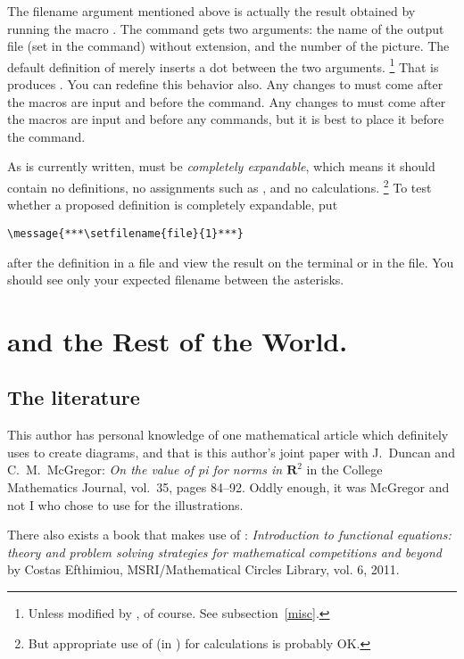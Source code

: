 \documentclass[letterpaper]{article}
\begin{document}
The filename argument mentioned above is actually the result obtained by
running the macro .
The command  gets two arguments: the name of the \MP{}
output file (set in the  command) without extension,
and the number of the picture. The default definition of
 merely inserts a dot between the two arguments.%
    \footnote{Unless modified by , of course.
    See subsection~\ref{misc}.}
That is  produces . You
can redefine this behavior also. Any changes to  must
come after the \mfp{} macros are input and before the
 command. Any changes to  must
come after the \mfp{} macros are input and before any 
commands, but it is best to place it before the 
command.

As \mfp{} is currently written,  must be
\emph{completely expandable}, which means it should contain no
definitions, no assignments such as , and no
calculations.%
    \footnote{But appropriate use of  (in \eTeX) for
    calculations is probably OK.}
To test whether a proposed definition is completely
expandable, put
\begin{verbatim}
\message{***\setfilename{file}{1}***}
\end{verbatim}
after the definition in a  file and view the result on the
terminal or in the  file. You should see only your expected
filename between the asterisks.


\section{ and the Rest of the World.}

\subsection{The literature}

This author has personal knowledge of one mathematical article
which definitely uses \mfp{} to create diagrams, and that is this
author's joint paper with J.~Duncan and C.~M.~McGregor: \textit{On the
value of pi for norms in $\mathbf{R}^2$} in the College Mathematics
Journal, vol.~35, pages 84--92. Oddly enough, it was McGregor and not I
who chose to use \mfp{} for the illustrations.

There also exists a book that makes use of \mfp{}: \textit{Introduction
to functional equations: theory and problem solving strategies for
mathematical competitions and beyond} by Costas Efthimiou,
MSRI/Mathematical Circles Library, vol. 6, 2011.
\end{document}
